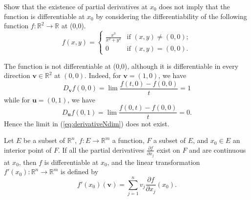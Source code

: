 \begin{exc}
  Show that the existence of partial derivatives at $x_0$
  does not imply that the function is differentiable at $x_0$
  by considering the differentiability of
  the following function $f: \mathbb{R}^2\rightarrow \mathbb{R}$
  at (0,0). 
  \begin{displaymath}
    f(x,y) =
    \begin{cases}
      \frac{x^3}{x^2+y^2} & \text{if } (x,y)\ne (0,0);
      \\
      0 & \text{if } (x,y)= (0,0).
    \end{cases}
  \end{displaymath}
\end{exc}
\begin{solution}
The function is not differentiable at (0,0),
  although it is differentiable in every direction $\mathbf{v}\in
  \mathbb{R}^2$ at $(0,0)$.
  Indeed, for $\mathbf{v}=(1,0)$, we have
  \begin{displaymath}
    D_{\mathbf{v}} f (0,0) = \lim \frac{f(t,0)-f(0,0)}{t}
    = 1
  \end{displaymath}
  while for $\mathbf{u}=(0,1)$, we have
  \begin{displaymath}
    D_{\mathbf{u}} f (0,1) = \lim \frac{f(0,t)-f(0,0)}{t}
    = 0.
  \end{displaymath}
  Hence the limit in (\ref{eq:derivativeNdim}) does not exist.
\end{solution}


\begin{thm}
  \label{thm:continuousParitialDerivativesImplyDifferentiability}
  Let $E$ be a subset of $\mathbb{R}^n$,
  $f: E\rightarrow \mathbb{R}^m$ a function,
  $F$ a subset of $E$,
  and $x_0\in E$ an interior point of $F$.
  If all the partial derivatives $\frac{\partial f}{\partial x_j}$
  exist on $F$ and are continuous at $x_0$,
  then $f$ is differentiable at $x_0$,
  and the linear transformation
  $f'(x_0): \mathbb{R}^n \rightarrow \mathbb{R}^m$ is defined by
  \begin{equation}
    \label{eq:continuousParitialDerivativesImplyDifferentiability}
    f'(x_0) (\mathbf{v})
    = \sum_{j=1}^n v_j \frac{\partial f}{\partial x_j} (x_0).
  \end{equation}
\end{thm}


